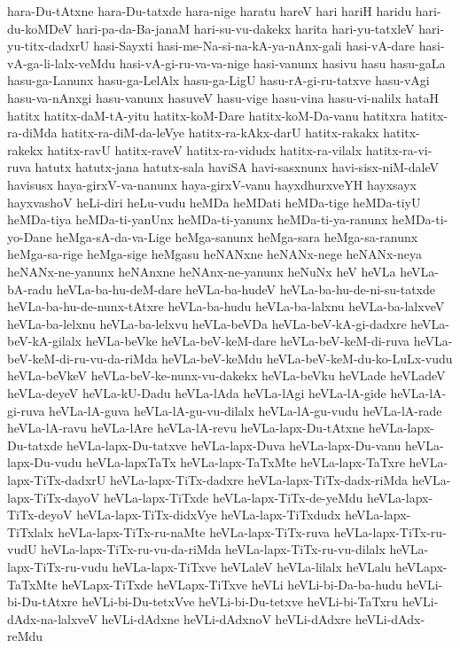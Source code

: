 {hara-Du-tAtxne
hara-Du-tatxde
hara-nige
haratu
hareV
hari
hariH
haridu
hari-du-koMDeV
hari-pa-da-Ba-janaM
hari-su-vu-dakekx
harita
hari-yu-tatxleV
hari-yu-titx-dadxrU
hasi-Sayxti
hasi-me-Na-si-na-kA-ya-nAnx-gali
hasi-vA-dare
hasi-vA-ga-li-lalx-veMdu
hasi-vA-gi-ru-va-va-nige
hasi-vanunx
hasivu
hasu
hasu-gaLa
hasu-ga-Lanunx
hasu-ga-LelAlx
hasu-ga-LigU
hasu-rA-gi-ru-tatxve
hasu-vAgi
hasu-va-nAnxgi
hasu-vanunx
hasuveV
hasu-vige
hasu-vina
hasu-vi-nalilx
hataH
hatitx
hatitx-daM-tA-yitu
hatitx-koM-Dare
hatitx-koM-Da-vanu
hatitxra
hatitx-ra-diMda
hatitx-ra-diM-da-leVye
hatitx-ra-kAkx-darU
hatitx-rakakx
hatitx-rakekx
hatitx-ravU
hatitx-raveV
hatitx-ra-vidudx
hatitx-ra-vilalx
hatitx-ra-vi-ruva
hatutx
hatutx-jana
hatutx-sala
haviSA
havi-sasxnunx
havi-sisx-niM-daleV
havisusx
haya-girxV-va-nanunx
haya-girxV-vanu
hayxdhurxveYH
hayxsayx
hayxvashoV
heLi-diri
heLu-vudu
heMDa
heMDati
heMDa-tige
heMDa-tiyU
heMDa-tiya
heMDa-ti-yanUnx
heMDa-ti-yanunx
heMDa-ti-ya-ranunx
heMDa-ti-yo-Dane
heMga-sA-da-va-Lige
heMga-sanunx
heMga-sara
heMga-sa-ranunx
heMga-sa-rige
heMga-sige
heMgasu
heNANxne
heNANx-nege
heNANx-neya
heNANx-ne-yanunx
heNAnxne
heNAnx-ne-yanunx
heNuNx
heV
heVLa
heVLa-bA-radu
heVLa-ba-hu-deM-dare
heVLa-ba-hudeV
heVLa-ba-hu-de-ni-su-tatxde
heVLa-ba-hu-de-nunx-tAtxre
heVLa-ba-hudu
heVLa-ba-lalxnu
heVLa-ba-lalxveV
heVLa-ba-lelxnu
heVLa-ba-lelxvu
heVLa-beVDa
heVLa-beV-kA-gi-dadxre
heVLa-beV-kA-gilalx
heVLa-beVke
heVLa-beV-keM-dare
heVLa-beV-keM-di-ruva
heVLa-beV-keM-di-ru-vu-da-riMda
heVLa-beV-keMdu
heVLa-beV-keM-du-ko-LuLx-vudu
heVLa-beVkeV
heVLa-beV-ke-nunx-vu-dakekx
heVLa-beVku
heVLade
heVLadeV
heVLa-deyeV
heVLa-kU-Dadu
heVLa-lAda
heVLa-lAgi
heVLa-lA-gide
heVLa-lA-gi-ruva
heVLa-lA-guva
heVLa-lA-gu-vu-dilalx
heVLa-lA-gu-vudu
heVLa-lA-rade
heVLa-lA-ravu
heVLa-lAre
heVLa-lA-revu
heVLa-lapx-Du-tAtxne
heVLa-lapx-Du-tatxde
heVLa-lapx-Du-tatxve
heVLa-lapx-Duva
heVLa-lapx-Du-vanu
heVLa-lapx-Du-vudu
heVLa-lapxTaTx
heVLa-lapx-TaTxMte
heVLa-lapx-TaTxre
heVLa-lapx-TiTx-dadxrU
heVLa-lapx-TiTx-dadxre
heVLa-lapx-TiTx-dadx-riMda
heVLa-lapx-TiTx-dayoV
heVLa-lapx-TiTxde
heVLa-lapx-TiTx-de-yeMdu
heVLa-lapx-TiTx-deyoV
heVLa-lapx-TiTx-didxVye
heVLa-lapx-TiTxdudx
heVLa-lapx-TiTxlalx
heVLa-lapx-TiTx-ru-naMte
heVLa-lapx-TiTx-ruva
heVLa-lapx-TiTx-ru-vudU
heVLa-lapx-TiTx-ru-vu-da-riMda
heVLa-lapx-TiTx-ru-vu-dilalx
heVLa-lapx-TiTx-ru-vudu
heVLa-lapx-TiTxve
heVLaleV
heVLa-lilalx
heVLalu
heVLapx-TaTxMte
heVLapx-TiTxde
heVLapx-TiTxve
heVLi
heVLi-bi-Da-ba-hudu
heVLi-bi-Du-tAtxre
heVLi-bi-Du-tetxVve
heVLi-bi-Du-tetxve
heVLi-bi-TaTxru
heVLi-dAdx-na-lalxveV
heVLi-dAdxne
heVLi-dAdxnoV
heVLi-dAdxre
heVLi-dAdx-reMdu
}
